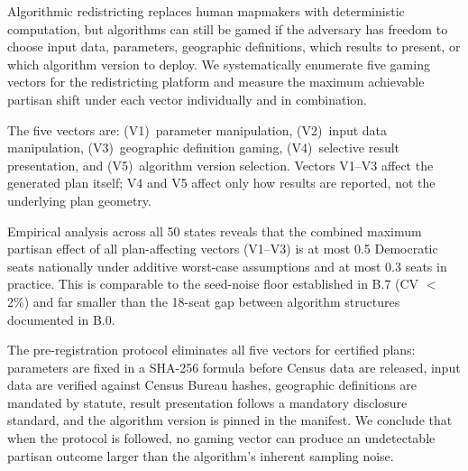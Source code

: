 Algorithmic redistricting replaces human mapmakers with deterministic computation,
but algorithms can still be gamed if the adversary has freedom to choose input
data, parameters, geographic definitions, which results to present, or which
algorithm version to deploy.
We systematically enumerate five gaming vectors for the \bisect{} redistricting
platform and measure the maximum achievable partisan shift under each vector
individually and in combination.

The five vectors are: (V1)~parameter manipulation, (V2)~input data manipulation,
(V3)~geographic definition gaming, (V4)~selective result presentation, and
(V5)~algorithm version selection.
Vectors V1--V3 affect the generated plan itself; V4 and V5 affect only how
results are reported, not the underlying plan geometry.

Empirical analysis across all 50 states reveals that the combined maximum
partisan effect of all plan-affecting vectors (V1--V3) is at most 0.5
Democratic seats nationally under additive worst-case assumptions and
at most 0.3 seats in practice.
This is comparable to the seed-noise floor established in B.7 (CV $<$ 2\%)
and far smaller than the 18-seat gap between algorithm structures documented
in B.0.

The \dia{} pre-registration protocol eliminates all five vectors for
certified plans: parameters are fixed in a SHA-256 formula before
Census data are released, input data are verified against Census Bureau
hashes, geographic definitions are mandated by statute, result presentation
follows a mandatory disclosure standard, and the algorithm version is
pinned in the manifest.
We conclude that when the \dia{} protocol is followed, no gaming vector
can produce an undetectable partisan outcome larger than the algorithm's
inherent sampling noise.
